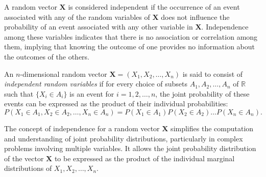 A random vector $\mathbf{X}$ is considered independent if the occurrence of an event associated with any of the random variables of $\mathbf{X}$ does not influence the probability of an event associated with any other variable in $\mathbf{X}$. Independence among these variables indicates that there is no association or correlation among them, implying that knowing the outcome of one provides no information about the outcomes of the others.

\begin{definition}\label{def:independent_random_variables}
An $n$-dimensional random vector $\mathbf{X} = (X_{1}, X_{2}, \ldots, X_{n})$ is said to consist of \emph{independent random variables} if for every choice of subsets $A_{1}, A_{2}, \ldots, A_{n}$ of $\mathbb{R}$ such that $\{ X_{i} \in A_{i} \}$ is an event for $i = 1, 2, \ldots, n$, the joint probability of these events can be expressed as the product of their individual probabilities:
\[
P\left( X_{1} \in A_{1}, X_{2} \in A_{2}, \ldots, X_{n} \in A_{n} \right) = P\left( X_{1} \in A_{1} \right) P\left( X_{2} \in A_{2} \right) \ldots P\left( X_{n} \in A_{n} \right).
\]
\end{definition}

The concept of independence for a random vector $\mathbf{X}$ simplifies the computation and understanding of joint probability distributions, particularly in complex problems involving multiple variables. It allows the joint probability distribution of the vector $\mathbf{X}$ to be expressed as the product of the individual marginal distributions of $X_{1}, X_{2}, \ldots, X_{n}$.

